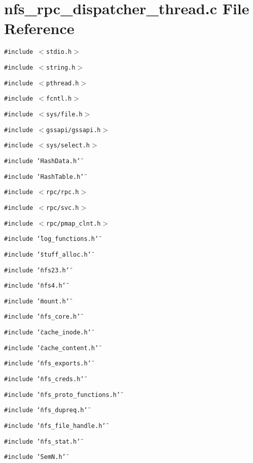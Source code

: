 \section{nfs\_\-rpc\_\-dispatcher\_\-thread.c File Reference}
\label{nfs__rpc__dispatcher__thread_8c}
{\tt \#include $<$stdio.h$>$}\par
{\tt \#include $<$string.h$>$}\par
{\tt \#include $<$pthread.h$>$}\par
{\tt \#include $<$fcntl.h$>$}\par
{\tt \#include $<$sys/file.h$>$}\par
{\tt \#include $<$gssapi/gssapi.h$>$}\par
{\tt \#include $<$sys/select.h$>$}\par
{\tt \#include \char`\"{}Hash\-Data.h\char`\"{}}\par
{\tt \#include \char`\"{}Hash\-Table.h\char`\"{}}\par
{\tt \#include $<$rpc/rpc.h$>$}\par
{\tt \#include $<$rpc/svc.h$>$}\par
{\tt \#include $<$rpc/pmap\_\-clnt.h$>$}\par
{\tt \#include \char`\"{}log\_\-functions.h\char`\"{}}\par
{\tt \#include \char`\"{}stuff\_\-alloc.h\char`\"{}}\par
{\tt \#include \char`\"{}nfs23.h\char`\"{}}\par
{\tt \#include \char`\"{}nfs4.h\char`\"{}}\par
{\tt \#include \char`\"{}mount.h\char`\"{}}\par
{\tt \#include \char`\"{}nfs\_\-core.h\char`\"{}}\par
{\tt \#include \char`\"{}cache\_\-inode.h\char`\"{}}\par
{\tt \#include \char`\"{}cache\_\-content.h\char`\"{}}\par
{\tt \#include \char`\"{}nfs\_\-exports.h\char`\"{}}\par
{\tt \#include \char`\"{}nfs\_\-creds.h\char`\"{}}\par
{\tt \#include \char`\"{}nfs\_\-proto\_\-functions.h\char`\"{}}\par
{\tt \#include \char`\"{}nfs\_\-dupreq.h\char`\"{}}\par
{\tt \#include \char`\"{}nfs\_\-file\_\-handle.h\char`\"{}}\par
{\tt \#include \char`\"{}nfs\_\-stat.h\char`\"{}}\par
{\tt \#include \char`\"{}Sem\-N.h\char`\"{}}\par
